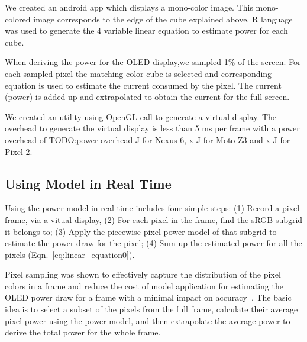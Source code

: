 We created an android app which displays a mono-color image. This mono-colored
image corresponds to the edge of the cube explained above. R language was used
to generate the 4 variable linear equation to estimate power for each cube.

When deriving the power for the OLED display,we sampled 1\%  of the screen.
For each sampled pixel the matching color cube is selected and corresponding
equation is used to estimate the current consumed by the pixel. 
The current (power) is added up and extrapolated to obtain  the current for
the full screen.

We created an utility using OpenGL call to generate a virtual display.
The overhead to generate the virtual display is less than 5 ms per frame with a
power overhead of {TODO:power overhead J for Nexus 6, x J for
Moto Z3 and x J for Pixel 2.}
\fi



\subsection{Using Model in Real Time}
\label{subsec:appl}

Using the power model in real time includes four simple steps:
(1) Record a pixel frame, \eg via a vitual display,
(2) For each pixel in the frame, find the sRGB subgrid it belongs to;
(3) Apply the piecewise pixel power model of that subgrid to
estimate the power draw for the pixel;
(4) Sum up the estimated power for all the pixels
(Eqn.~\ref{eq:linear_equation0}).



Pixel sampling was shown to effectively capture the distribution of
the pixel colors in a frame and reduce the cost of model application
for estimating the OLED power draw for a frame with a minimal impact
on accuracy~\cite{dong2009current}. The basic idea is to select a
subset of the pixels from the full frame, calculate their average
pixel power using the power model, and then extrapolate the average power to derive
the total power for the whole frame.
\fi

